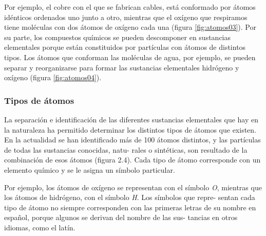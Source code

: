 \documentclass[11pt]{book}
\begin{document}
Por ejemplo, el cobre
con el que se fabrican cables, está conformado por átomos idénticos ordenados uno junto a otro,
mientras que el oxígeno que respiramos tiene moléculas con dos átomos de oxígeno cada una (figura
\ref{fig:atomos03}). Por su parte, los compuestos químicos se pueden descomponer en sustancias elementales porque están constituidos por partículas
con átomos de distintos tipos. Los átomos que conforman las moléculas de agua, por ejemplo, se pueden separar y reorganizarse para
formar las sustancias elementales hidrógeno y oxígeno (figura \ref{fig:atomos04}).\\

\subsubsection{Tipos de \'atomos}

La separación e identificación de las diferentes sustancias elementales que
hay en la naturaleza ha permitido determinar los distintos tipos de átomos
que existen. En la actualidad se han identificado más de 100 átomos
distintos, y las partículas de todas las sustancias conocidas, natu-
rales o sintéticas, son resultado de la combinación de esos átomos
(figura 2.4). Cada tipo de átomo corresponde con un elemento
químico y se le asigna un símbolo particular.

Por ejemplo, los
átomos de oxígeno se representan con el símbolo \emph{O}, mientras que
los átomos de hidrógeno, con el símbolo \emph{H}. Los símbolos que repre-
sentan cada tipo de átomo no siempre corresponden con las primeras letras
de su nombre en español, porque algunos se derivan del nombre de las sus-
tancias en otros idiomas, como el latín.\\
\end{document}
